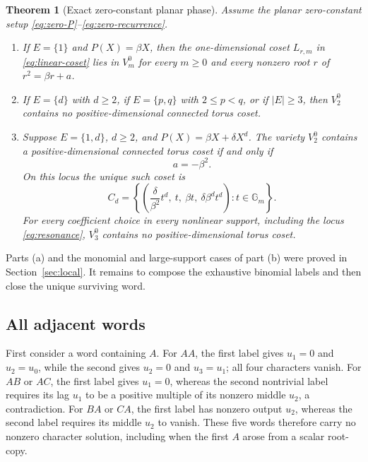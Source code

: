 \documentclass[11pt]{article}
\newtheorem{theorem}{Theorem}[section]
\theoremstyle{definition}
\theoremstyle{remark}
\newcommand{\Gm}{\mathbb{G}_{m}}
\begin{document}
\begin{theorem}[Exact zero-constant planar phase]
\label{thm:zero-phase}
Assume the planar zero-constant setup \eqref{eq:zero-P}--\eqref{eq:zero-recurrence}.
\begin{enumerate}[label=(\alph*)]
\item If $E=\{1\}$ and $P(X)=\beta X$, then the one-dimensional coset $L_{r,m}$ in \eqref{eq:linear-coset} lies in $V_m^0$ for every $m\geq0$ and every nonzero root $r$ of $r^2=\beta r+a$.
\item If $E=\{d\}$ with $d\geq2$, if $E=\{p,q\}$ with $2\leq p<q$, or if $|E|\geq3$, then $V_2^0$ contains no positive-dimensional connected torus coset.
\item Suppose $E=\{1,d\}$, $d\geq2$, and
$P(X)=\beta X+\delta X^d$.  The variety $V_2^0$ contains a positive-dimensional connected torus coset if and only if
\begin{equation}
a=-\beta^2.
\label{eq:resonance}
\end{equation}
On this locus the unique such coset is
\begin{equation}
C_d=\left\{\left(
\frac{\delta}{\beta^2}t^d,\ t,\ \beta t,\
\delta\beta^dt^d\right):t\in\Gm\right\}.
\label{eq:Cd}
\end{equation}
For every coefficient choice in every nonlinear support, including the locus \eqref{eq:resonance}, $V_3^0$ contains no positive-dimensional torus coset.
\end{enumerate}
\end{theorem}

Parts (a) and the monomial and large-support cases of part (b) were proved in Section~\ref{sec:local}.  It remains to compose the exhaustive binomial labels and then close the unique surviving word.

\subsection{All adjacent words}

First consider a word containing $A$.  For $AA$, the first label gives
$u_1=0$ and $u_2=u_0$, while the second gives $u_2=0$ and $u_3=u_1$; all four characters vanish.  For $AB$ or $AC$, the first label gives $u_1=0$, whereas the second nontrivial label requires its lag $u_1$ to be a positive multiple of its nonzero middle $u_2$, a contradiction.  For $BA$ or $CA$, the first label has nonzero output $u_2$, whereas the second label requires its middle $u_2$ to vanish.  These five words therefore carry no nonzero character solution, including when the first $A$ arose from a scalar root-copy.
\end{document}
